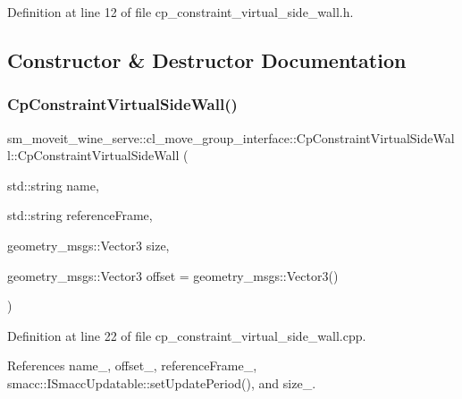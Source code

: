 Definition at line 12 of file cp\+\_\+constraint\+\_\+virtual\+\_\+side\+\_\+wall.\+h.



\subsection{Constructor \& Destructor Documentation}
\mbox{\label{classsm__moveit__wine__serve_1_1cl__move__group__interface_1_1CpConstraintVirtualSideWall_a3a360da5959b2be141030456edfa461e}} 
\subsubsection{\texorpdfstring{Cp\+Constraint\+Virtual\+Side\+Wall()}{CpConstraintVirtualSideWall()}\hspace{0.1cm}{\footnotesize\ttfamily [1/2]}}
{\footnotesize\ttfamily sm\+\_\+moveit\+\_\+wine\+\_\+serve\+::cl\+\_\+move\+\_\+group\+\_\+interface\+::\+Cp\+Constraint\+Virtual\+Side\+Wall\+::\+Cp\+Constraint\+Virtual\+Side\+Wall (\begin{DoxyParamCaption}\item[{std\+::string}]{name,  }\item[{std\+::string}]{reference\+Frame,  }\item[{geometry\+\_\+msgs\+::\+Vector3}]{size,  }\item[{geometry\+\_\+msgs\+::\+Vector3}]{offset = {\ttfamily geometry\+\_\+msgs\+:\+:Vector3()} }\end{DoxyParamCaption})}



Definition at line 22 of file cp\+\_\+constraint\+\_\+virtual\+\_\+side\+\_\+wall.\+cpp.



References name\+\_\+, offset\+\_\+, reference\+Frame\+\_\+, smacc\+::\+I\+Smacc\+Updatable\+::set\+Update\+Period(), and size\+\_\+.



